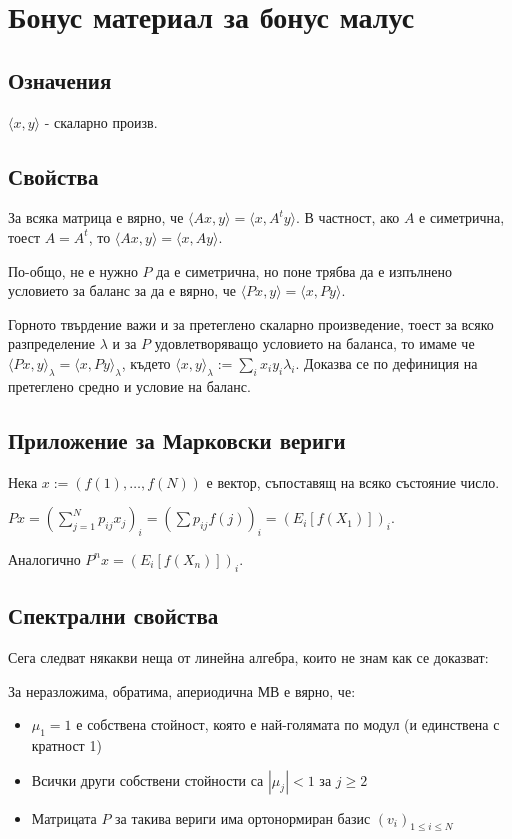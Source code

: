 \documentclass{article}
\begin{document}
\section{Бонус материал за бонус малус}
\subsection{Означения}
$\langle x,y \rangle$ - скаларно произв.

\subsection{Свойства}
За всяка матрица е вярно, че $\langle Ax,y \rangle = \langle x,A^t y \rangle$. В частност, ако $A$ е симетрична, тоест $A=A^t$, то $\langle Ax,y \rangle = \langle x,Ay \rangle$.

По-общо, не е нужно $P$ да е симетрична, но поне трябва да е изпълнено условието за баланс за да е вярно, че $\langle Px,y \rangle = \langle x,Py \rangle$.

Горното твърдение важи и за претеглено скаларно произведение, тоест за всяко разпределение $\lambda$ и за $P$ удовлетворяващо условието на баланса, то имаме че $\langle Px,y \rangle_\lambda = \langle x,Py \rangle_\lambda$, където $\langle x,y \rangle_\lambda := \sum_{i} x_i y_i \lambda_i$. Доказва се по дефиниция на претеглено средно и условие на баланс.

\subsection{Приложение за Марковски вериги}
Нека $x := (f(1),\dots,f(N))$ е вектор, съпоставящ на всяко състояние число.

$Px = \left( \sum_{j=1}^N p_{ij} x_j \right)_i = \left( \sum p_{ij} f(j) \right)_i = \left( E_i[f(X_1)] \right)_i$.

Аналогично $P^n x = \left( E_i[f(X_n)] \right)_i$.

\subsection{Спектрални свойства}
Сега следват някакви неща от линейна алгебра, които не знам как се доказват:

За неразложима, обратима, апериодична МВ е вярно, че:
\begin{itemize}
\item $\mu_1=1$ е собствена стойност, която е най-голямата по модул (и единствена с кратност 1)
\item Всички други собствени стойности са $|\mu_j|<1$ за $j\geq2$
\item Матрицата $P$ за такива вериги има ортонормиран базис $(v_i)_{1\leq i\leq N}$
\end{itemize}
\end{document}

